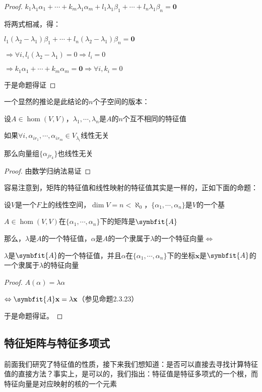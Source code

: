 \documentclass[12pt, a4paper, oneside, UTF8]{ctexbook}
\begin{document}
\begin{para}{0}
\begin{proof}
						$k_1\lambda_1\alpha_1 +\cdots+k_m\lambda_1\alpha_m+l_1\lambda_1\beta_1+\cdots+l_n\lambda_1\beta_n=\mathbf{0}$

						将两式相减，得：

						$l_1(\lambda_2-\lambda_1)\beta_1+\cdots+l_n(\lambda_2-\lambda_1)\beta_n=\mathbf{0}$

						$\Rightarrow \forall i,l_i(\lambda_2-\lambda_1)=0 \Rightarrow l_i=0$

						$\Rightarrow k_1\alpha_1+\cdots+k_m\alpha_m=\mathbf{0} \Rightarrow \forall i, k_i =0$

						于是命题得证
					\end{proof}
					一个显然的推论是此结论的$n$个子空间的版本：
					\begin{corollary}{}
						设$A \in \hom(V,V)$，$\lambda_1,\cdots,\lambda_n$是$A$的$n$个互不相同的特征值

						如果$\forall i,\alpha_{ir_1},\cdots,\alpha_{ir_m} \in V_{\lambda_i}$线性无关

						那么向量组$\{\alpha_{jr_k}\}$也线性无关
					\end{corollary}
					\begin{proof}
						由数学归纳法易证
					\end{proof}
				\point{}
					
					容易注意到，矩阵的特征值和线性映射的特征值其实是一样的，正如下面的命题：
					\begin{proposition}
						设$V$是一个$F$上的线性空间，$\dim V = n < \aleph_0$，$\{\alpha_1,\cdots,\alpha_n\}$是$V$的一个基

						$A \in \hom(V,V)$在$\{\alpha_1,\cdots,\alpha_n\}$下的矩阵是$\symbfit{A}$

						那么，$\lambda $是$A$的一个特征值，$\alpha $是$A$的一个隶属于$\lambda $的一个特征向量$\Leftrightarrow$

						$\lambda $是$\symbfit{A}$的一个特征值，并且$\alpha $在$\{\alpha_1,\cdots,\alpha_n\}$下的坐标$\mathbf{x}$是$\symbfit{A}$的一个隶属于$\lambda $的特征向量
					\end{proposition}
					\begin{proof}
						$A(\alpha )=\lambda \alpha $

						$\Leftrightarrow \symbfit{A}\mathbf{x}=\lambda \mathbf{x}$（参见命题2.3.23）

						于是命题得证。
					\end{proof}
			\end{para}
		\subsection{特征矩阵与特征多项式}
			前面我们研究了特征值的性质，接下来我们想知道：是否可以直接去寻找计算特征值的直接方法？事实上，是可以的，我们指出：特征值是特征多项式的一个根，而特征向量是对应映射的核的一个元素
\end{document}

